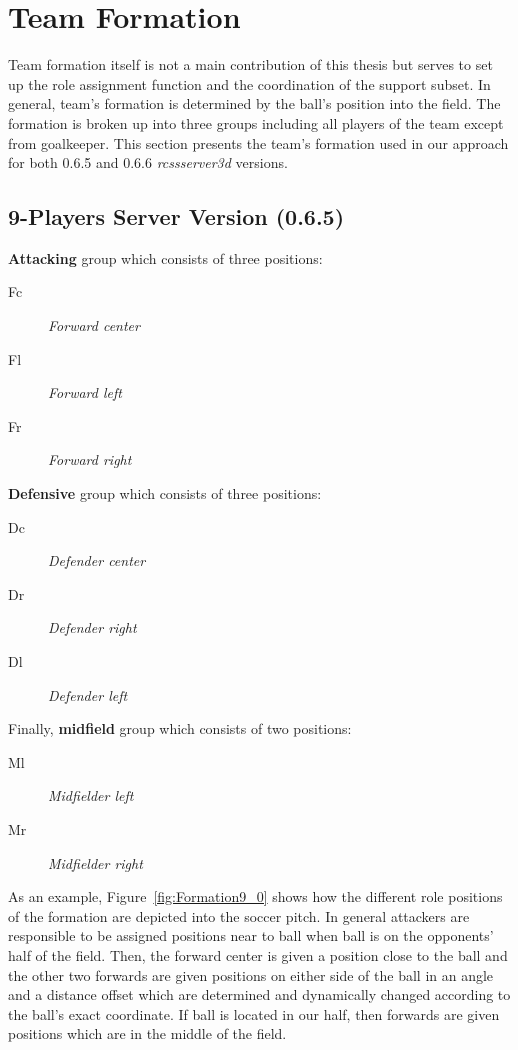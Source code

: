 \section{Team Formation}
Team formation itself is not a main contribution of this thesis but serves to set up the role assignment function and the coordination of the support subset. In general, team's formation is determined by the ball's position into the field. The formation is broken up into three groups including all players of the team except from goalkeeper. This section presents the team's formation used in our approach for both 0.6.5 and 0.6.6 \textit{rcssserver3d} versions.
\subsection{9-Players Server Version (0.6.5)}
\textbf{Attacking} group which consists of three positions:
\begin{description}
\item[Fc] \textit{Forward center}
\item[Fl] \textit{Forward left}
\item[Fr] \textit{Forward right}
\end{description}
\textbf{Defensive} group which consists of three positions:
\begin{description}
\item[Dc] \textit{Defender center}
\item[Dr] \textit{Defender right }
\item[Dl] \textit{Defender left}
\end{description}
Finally, \textbf{midfield} group which consists of two positions:
\begin{description}
\item[Ml] \textit{Midfielder left}
\item[Mr] \textit{Midfielder right}
\end{description}
As an example, Figure~\ref{fig:Formation9_0} shows how the different role positions of the formation are depicted into the soccer pitch. In general attackers are responsible to be assigned positions near to ball when ball is on the opponents' half of the field. Then, the forward center  is given a position close to the ball and the other two forwards are given positions on either side of the ball in an angle and a distance offset which are determined and dynamically changed according to the ball's exact coordinate. If ball is located in our half, then forwards are given positions which are in the middle of the field. 

